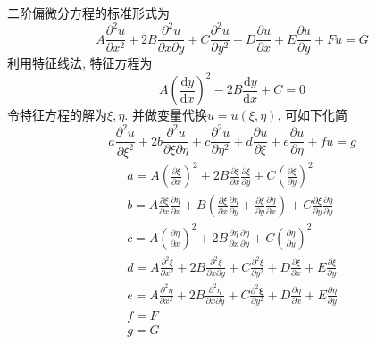 \documentclass[UTF8,9pt]{ctexart}
\begin{document}
二阶偏微分方程的标准形式为
$$ 
A \frac{\partial^{2} u}{\partial x^{2}}+2 B \frac{\partial^{2} u}{\partial x \partial y}+C \frac{\partial^{2} u}{\partial y^{2}}+D \frac{\partial u}{\partial x}+E \frac{\partial u}{\partial y}+F u=G
$$
利用特征线法, 特征方程为$$ 
A\left(\frac{\mathrm{d} y}{\mathrm{d} x}\right)^{2}-2 B \frac{\mathrm{d} y}{\mathrm{d} x}+C=0
$$
令特征方程的解为$\xi,\eta$. 并做变量代换$u=u(\xi,\eta)$, 可如下化简
$$ 
a \frac{\partial^{2} u}{\partial \xi^{2}}+2 b \frac{\partial^{2} u}{\partial \xi \partial \eta}+c \frac{\partial^{2} u}{\partial \eta^{2}}+d \frac{\partial u}{\partial \xi}+e \frac{\partial u}{\partial \eta}+f u=g
$$
$$ 
\begin{array}{l}{a=A\left(\frac{\partial \xi}{\partial x}\right)^{2}+2 B \frac{\partial \xi}{\partial x} \frac{\partial \xi}{\partial y}+C\left(\frac{\partial \xi}{\partial y}\right)^{2}} \\ {b=A \frac{\partial \xi}{\partial x} \frac{\partial \eta}{\partial x}+B\left(\frac{\partial \xi}{\partial x} \frac{\partial \eta}{\partial y}+\frac{\partial \xi}{\partial y} \frac{\partial \eta}{\partial x}\right)+C \frac{\partial \xi}{\partial y} \frac{\partial \eta}{\partial y}} \\ {c=A\left(\frac{\partial \eta}{\partial x}\right)^{2}+2 B \frac{\partial \eta}{\partial x} \frac{\partial \eta}{\partial y}+C\left(\frac{\partial \eta}{\partial y}\right)^{2}} \\ {d=A \frac{\partial^{2} \xi}{\partial x^{2}}+2 B \frac{\partial^{2} \xi}{\partial x \partial y}+C \frac{\partial^{2} \xi}{\partial y^{2}}+D \frac{\partial \xi}{\partial x}+E \frac{\partial \xi}{\partial y}} \\ {e=A \frac{\partial^{2} \eta}{\partial x^{2}}+2 B \frac{\partial^{2} \eta}{\partial x \partial y}+C \frac{\partial^{2} \boldsymbol{\xi}}{\partial y^{2}}+D \frac{\partial \eta}{\partial x}+E \frac{\partial \eta}{\partial y}} \\ {f=F} \\ {g=G}\end{array}
$$
\end{document}
